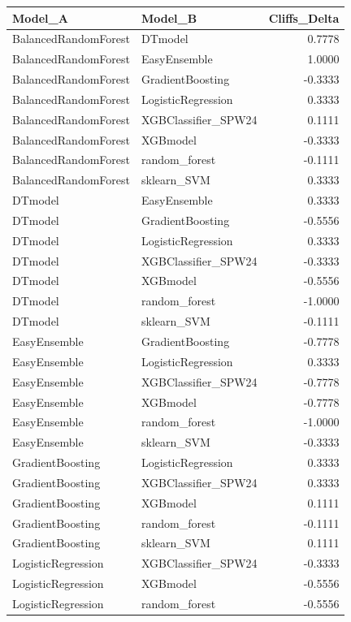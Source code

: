 \begin{table}[t]
\centering
\begin{tabular}{llr}
\toprule
Model_A & Model_B & Cliffs_Delta \\
\midrule
BalancedRandomForest & DTmodel & 0.7778 \\
BalancedRandomForest & EasyEnsemble & 1.0000 \\
BalancedRandomForest & GradientBoosting & -0.3333 \\
BalancedRandomForest & LogisticRegression & 0.3333 \\
BalancedRandomForest & XGBClassifier_SPW24 & 0.1111 \\
BalancedRandomForest & XGBmodel & -0.3333 \\
BalancedRandomForest & random_forest & -0.1111 \\
BalancedRandomForest & sklearn_SVM & 0.3333 \\
DTmodel & EasyEnsemble & 0.3333 \\
DTmodel & GradientBoosting & -0.5556 \\
DTmodel & LogisticRegression & 0.3333 \\
DTmodel & XGBClassifier_SPW24 & -0.3333 \\
DTmodel & XGBmodel & -0.5556 \\
DTmodel & random_forest & -1.0000 \\
DTmodel & sklearn_SVM & -0.1111 \\
EasyEnsemble & GradientBoosting & -0.7778 \\
EasyEnsemble & LogisticRegression & 0.3333 \\
EasyEnsemble & XGBClassifier_SPW24 & -0.7778 \\
EasyEnsemble & XGBmodel & -0.7778 \\
EasyEnsemble & random_forest & -1.0000 \\
EasyEnsemble & sklearn_SVM & -0.3333 \\
GradientBoosting & LogisticRegression & 0.3333 \\
GradientBoosting & XGBClassifier_SPW24 & 0.3333 \\
GradientBoosting & XGBmodel & 0.1111 \\
GradientBoosting & random_forest & -0.1111 \\
GradientBoosting & sklearn_SVM & 0.1111 \\
LogisticRegression & XGBClassifier_SPW24 & -0.3333 \\
LogisticRegression & XGBmodel & -0.5556 \\
LogisticRegression & random_forest & -0.5556 \\

\end{tabular}
\end{table}
